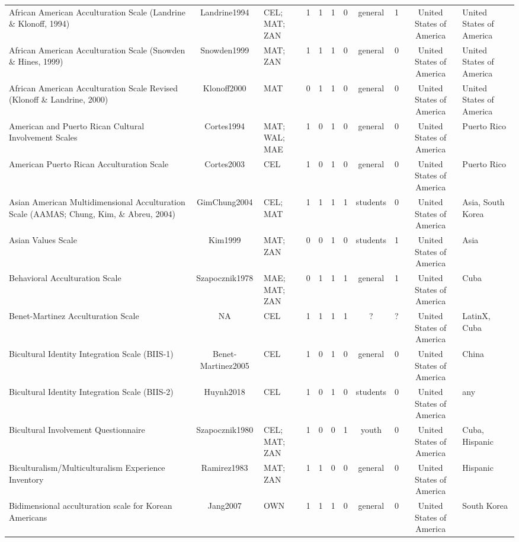 \begin{longtable}[l]{lclclclclcl}
African American Acculturation Scale (Landrine \& Klonoff, 1994) & Landrine1994 & CEL; MAT; ZAN & 1 & 1 & 1 & 0 & general & 1 & United States of America & United States of America\\
African American Acculturation Scale (Snowden \& Hines, 1999) & Snowden1999 & MAT; ZAN & 1 & 1 & 1 & 0 & general & 0 & United States of America & United States of America\\
African American Acculturation Scale Revised (Klonoff \& Landrine, 2000) & Klonoff2000 & MAT & 0 & 1 & 1 & 0 & general & 0 & United States of America & United States of America\\
American and Puerto Rican Cultural Involvement Scales & Cortes1994 & MAT; WAL; MAE & 1 & 0 & 1 & 0 & general & 0 & United States of America & Puerto Rico\\
American Puerto Rican Acculturation Scale & Cortes2003 & CEL & 1 & 0 & 1 & 0 & general & 0 & United States of America & Puerto Rico\\
Asian American Multidimensional Acculturation Scale (AAMAS; Chung, Kim, \& Abreu, 2004) & GimChung2004 & CEL; MAT & 1 & 1 & 1 & 1 & students & 0 & United States of America & Asia, South Korea\\
Asian Values Scale & Kim1999 & MAT; ZAN & 0 & 0 & 1 & 0 & students & 1 & United States of America & Asia\\
Behavioral Acculturation Scale & Szapocznik1978 & MAE; MAT; ZAN & 0 & 1 & 1 & 1 & general & 1 & United States of America & Cuba\\
Benet-Martinez Acculturation Scale & NA & CEL & 1 & 1 & 1 & 1 & ? & ? & United States of America & LatinX, Cuba\\
Bicultural Identity Integration Scale (BIIS-1) & Benet-Martinez2005 & CEL & 1 & 0 & 1 & 0 & general & 0 & United States of America & China\\
Bicultural Identity Integration Scale (BIIS-2) & Huynh2018 & CEL & 1 & 0 & 1 & 0 & students & 0 & United States of America & any\\
Bicultural Involvement Questionnaire & Szapocznik1980 & CEL; MAT; ZAN & 1 & 0 & 0 & 1 & youth & 0 & United States of America & Cuba, Hispanic\\
Biculturalism/Multiculturalism Experience Inventory & Ramirez1983 & MAT; ZAN & 1 & 1 & 0 & 0 & general & 0 & United States of America & Hispanic\\
Bidimensional acculturation scale for Korean Americans & Jang2007 & OWN & 1 & 1 & 1 & 0 & general & 0 & United States of America & South Korea\\

\end{longtable}
